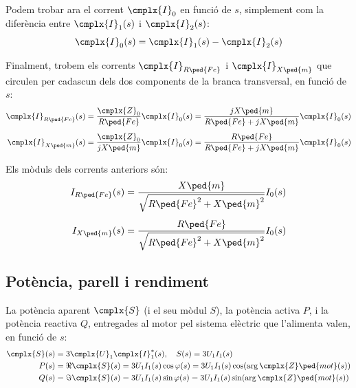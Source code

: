 Podem trobar ara el corrent $\cmplx{I}_0$ en funció de $s$, simplement com la diferència entre  $\cmplx{I}_1(s)$ i  $\cmplx{I}_2(s)$:
\begin{equation}
    \cmplx{I}_0(s) = \cmplx{I}_1(s) - \cmplx{I}_2(s)
\end{equation}

Finalment,  trobem els corrents $\cmplx{I}_{R\ped{Fe}}$ i $\cmplx{I}_{X\ped{m}}$ que circulen per cadascun dels dos components de la branca transversal, en funció de $s$:
\begin{subequations}
\begin{align}
    \cmplx{I}_{R\ped{Fe}}(s) &= \frac{\cmplx{Z}_0}{R\ped{Fe}} \cmplx{I}_0(s) = \frac{j X\ped{m}}{ R\ped{Fe} + j X\ped{m}}  \cmplx{I}_0(s) \\[1ex]
    \cmplx{I}_{X\ped{m}}(s) &= \frac{\cmplx{Z}_0}{j X\ped{m}} \cmplx{I}_0(s) = \frac{
    R\ped{Fe}}{ R\ped{Fe} + j X\ped{m}}  \cmplx{I}_0(s)
\end{align}
\end{subequations}

Els mòduls dels corrents anteriors són:
\begin{subequations}
\begin{align}
    I_{R\ped{Fe}}(s) &=  \frac{X\ped{m}}{\sqrt{R\ped{Fe}^2 + X\ped{m}^2}}  I_0(s) \\[1ex]
    I_{X\ped{m}}(s) &=   \frac{R\ped{Fe}}{\sqrt{R\ped{Fe}^2 + X\ped{m}^2}}  I_0(s)
\end{align}
\end{subequations}

\subsection{Potència, parell i rendiment}\label{sec:mot-p-t}

La potència aparent $\cmplx{S}$ (i el seu mòdul $S$), la potència activa  $P$, i la potència reactiva $Q$, entregades al motor pel sistema elèctric que l'alimenta valen, en funció de $s$:
\begin{subequations}\index{motors d'inducció!potència activa}\index{motors d'inducció!potència reactiva}\index{motors d'inducció!potència aparent}
\begin{align}
	\cmplx{S}(s)  &=  3 \cmplx{U}_1 \cmplx{I}_1^*(s), \quad S(s)  =  3 U_1 I_1(s)\label{eq:mot-S}\\
    P(s)  &=  \Re \cmplx{S}(s) = 3 U_1 I_1(s) \cos\varphi(s) = 3 U_1 I_1(s) \cos(\arg\cmplx{Z}\ped{mot}(s))\label{eq:mot-P}\\
    Q(s)  &=  \Im \cmplx{S}(s) = 3 U_1 I_1(s) \sin\varphi(s) = 3 U_1 I_1(s) \sin (\arg\cmplx{Z}\ped{mot}(s))\label{eq:mot-Q}
\end{align}
\end{subequations}

